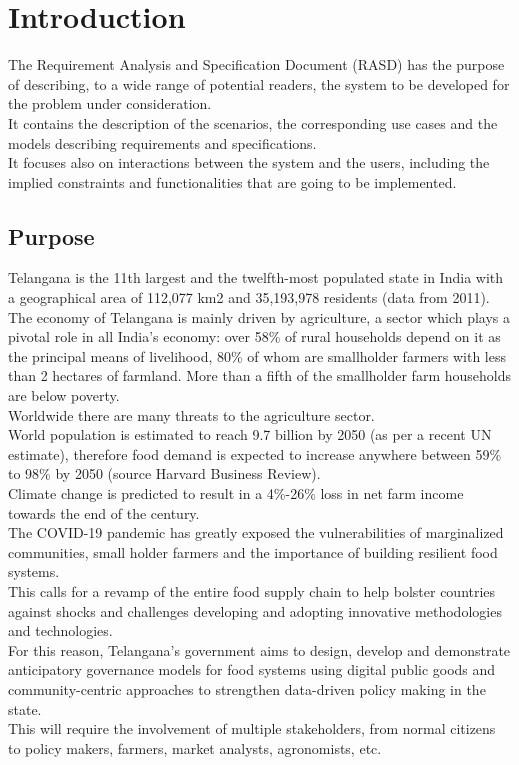 \documentclass[a4paper,11pt]{report}
\begin{document}
\chapter{Introduction}
The Requirement Analysis and Specification Document (RASD) has the purpose of describing, to a wide range of potential readers, the system to be developed for the problem under consideration.\\ 
It contains the description of the scenarios, the corresponding use cases and the models describing requirements and specifications.\\
It focuses also on interactions between the system and the users, including the implied  constraints and functionalities that are going to be implemented.

\section{Purpose}
Telangana is the 11th largest and the twelfth-most populated state in India with a geographical area of 112,077 km2 and 35,193,978 residents (data from 2011).\\

The economy of Telangana is mainly driven by agriculture, a sector which plays a pivotal role in all India’s economy: over 58\% of rural households depend on it as the principal means of livelihood, 80\% of whom are smallholder farmers with less than 2 hectares of farmland. More than a fifth of the smallholder farm households are below poverty.\\

Worldwide there are many threats to the agriculture sector.\\
World population is estimated to reach 9.7 billion by 2050 (as per a recent UN estimate), therefore food demand is expected to increase anywhere between 59\% to 98\% by 2050 (source Harvard Business Review).\\
Climate change is predicted to result in a 4\%-26\% loss in net farm income towards the end of the century.\\
The COVID-19 pandemic has greatly exposed the vulnerabilities of marginalized communities, small holder farmers and the importance of building resilient food systems.\\

This calls for a revamp of the entire food supply chain to help bolster countries against shocks and challenges developing and adopting innovative methodologies and technologies.\\
For this reason, Telangana’s government aims to design, develop and demonstrate anticipatory governance models for food systems using digital public goods and community-centric approaches to strengthen data-driven policy making in the state.\\
This will require the involvement of multiple stakeholders, from normal citizens to policy makers, farmers, market analysts, agronomists, etc.\\
\end{document}
